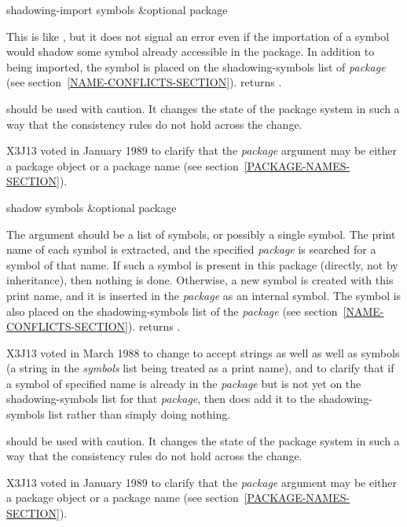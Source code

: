 \begin{defun}[Function]
shadowing-import symbols &optional package

This is like , but it does not signal an error even if the
importation of a symbol would shadow some symbol already accessible in
the package.  In addition to being imported, the symbol is placed on the
shadowing-symbols list of \emph{package}
(see section~\ref{NAME-CONFLICTS-SECTION}).
 returns {\true}.

 should be used with
caution.  It changes the state of the package system in such a way that
the consistency rules do not hold across the change.

\begin{new}
X3J13 voted in January 1989
to clarify that the \emph{package} argument may be either a package object
or a package name (see section~\ref{PACKAGE-NAMES-SECTION}).
\end{new}
\end{defun}

\begin{defun}[Function]
shadow symbols &optional package

The argument should be a list of symbols, or possibly a single symbol.
The print name of each symbol is extracted, and the specified \emph{package} is
searched for a symbol of that name.  If such a symbol is present in this
package (directly, not by inheritance), then nothing is done.  Otherwise,
a new symbol is created with this print name, and it is inserted in the
\emph{package} as an internal symbol.  The symbol is also placed on the
shadowing-symbols list of the \emph{package}
(see section~\ref{NAME-CONFLICTS-SECTION}).
 returns {\true}.

\begin{newer}
X3J13 voted in March 1988 
to change  to accept strings as well as well as symbols
(a string in the \emph{symbols} list being treated as a print name),
and to clarify that if a symbol of specified name is already in
the \emph{package} but is not yet on the shadowing-symbols list
for that \emph{package}, then  does add it to the shadowing-symbols
list rather than simply doing nothing.
\end{newer}

 should be used with
caution.  It changes the state of the package system in such a way that
the consistency rules do not hold across the change.

\begin{new}
X3J13 voted in January 1989
to clarify that the \emph{package} argument may be either a package object
or a package name (see section~\ref{PACKAGE-NAMES-SECTION}).
\end{new}
\end{defun}

